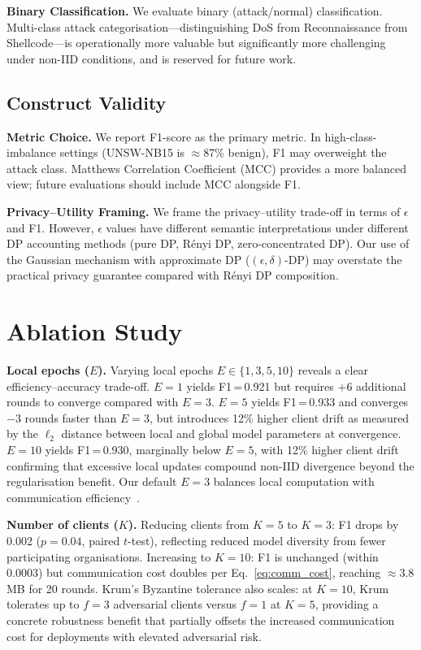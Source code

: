 \documentclass[conference]{IEEEtran}
\begin{document}
\textbf{Binary Classification.}
We evaluate binary (attack/normal) classification.
Multi-class attack categorisation---distinguishing DoS from
Reconnaissance from Shellcode---is operationally more valuable but
significantly more challenging under non-IID conditions, and is
reserved for future work.

\subsection{Construct Validity}

\textbf{Metric Choice.}
We report F1-score as the primary metric.
In high-class-imbalance settings (UNSW-NB15 is $\approx$87\% benign),
F1 may overweight the attack class.
Matthews Correlation Coefficient (MCC) provides a more balanced
view; future evaluations should include MCC alongside F1.

\textbf{Privacy--Utility Framing.}
We frame the privacy--utility trade-off in terms of $\epsilon$ and F1.
However, $\epsilon$ values have different semantic interpretations
under different DP accounting methods (pure DP, R\'{e}nyi DP,
zero-concentrated DP).
Our use of the Gaussian mechanism with approximate DP
($(\epsilon,\delta)$-DP) may overstate the practical privacy
guarantee compared with R\'{e}nyi DP composition.

\section{Ablation Study}

\textbf{Local epochs ($E$).}
Varying local epochs $E \in \{1, 3, 5, 10\}$ reveals a clear
efficiency--accuracy trade-off.
$E=1$ yields F1\,=\,0.921 but requires $+6$ additional rounds to
converge compared with $E=3$.
$E=5$ yields F1\,=\,0.933 and converges $-3$ rounds faster than $E=3$,
but introduces 12\% higher client drift as measured by the $\ell_2$
distance between local and global model parameters at convergence.
$E=10$ yields F1\,=\,0.930, marginally below $E=5$, with 12\% higher
client drift confirming that excessive local updates compound non-IID
divergence beyond the regularisation benefit.
Our default $E=3$ balances local computation with communication
efficiency~\cite{mcmahan2017}.

\textbf{Number of clients ($K$).}
Reducing clients from $K=5$ to $K=3$: F1 drops by 0.002
($p=0.04$, paired $t$-test), reflecting reduced model diversity
from fewer participating organisations.
Increasing to $K=10$: F1 is unchanged (within 0.0003) but
communication cost doubles per Eq.~\ref{eq:comm_cost}, reaching
$\approx$3.8\,MB for 20 rounds.
Krum's Byzantine tolerance also scales: at $K=10$, Krum tolerates
up to $f=3$ adversarial clients versus $f=1$ at $K=5$, providing
a concrete robustness benefit that partially offsets the increased
communication cost for deployments with elevated adversarial risk.
\end{document}
